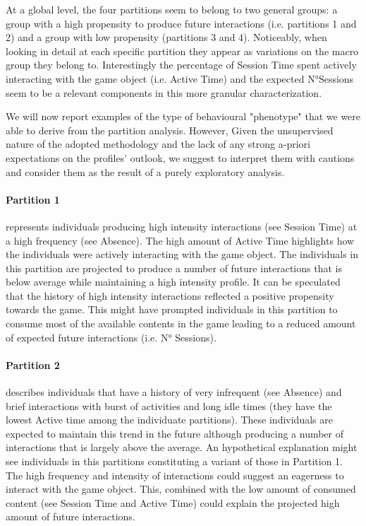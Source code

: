 At a global level, the four partitions seem to belong to two general groups: a group with a high propensity to produce future interactions (i.e. partitions 1 and 2) and a group with low propensity (partitions 3 and 4). Noticeably, when looking in detail at each specific partition they appear as variations on the macro group they belong to. Interestingly the percentage of Session Time spent actively interacting with the game object (i.e. Active Time) and the expected N°Sessions seem to be a relevant components in this more granular characterization. 

We will now report examples of the type of behavioural "phenotype" that we were able to derive from the partition analysis. However, Given the unsupervised nature of the adopted methodology and the lack of any strong a-priori expectations on the profiles' outlook, we suggest to interpret them with cautions and consider them as the result of a purely exploratory analysis.

\paragraph*{\textbf{Partition 1}} represents individuals producing high intensity interactions (see Session Time) at a high frequency (see Absence). The high amount of Active Time highlights how the individuals were actively interacting with the game object. The individuals in this partition are projected to produce a number of future interactions that is below average while maintaining a high intensity profile. It can be speculated that the history of high intensity interactions reflected a positive propensity towards the game. This might have prompted individuals in this partition to consume most of the available contents in the game leading to a reduced amount of expected future interactions (i.e. N° Sessions).

\paragraph*{\textbf{Partition 2}} describes individuals that have a history of very infrequent (see Absence) and brief interactions with burst of activities and long idle times (they have the lowest Active time among the individuate partitions). These individuals are expected to maintain this trend in the future although producing a number of interactions that is largely above the average. An hypothetical explanation might see individuals in this partitions constituting a variant of those in Partition 1. The high frequency and intensity of interactions could suggest an eagerness to interact with the game object. This, combined with the low amount of consumed content (see Session Time and Active Time) could explain the projected high amount of future interactions.

